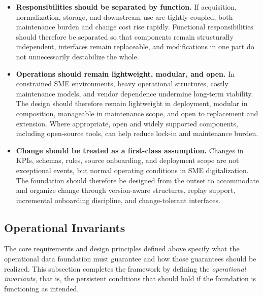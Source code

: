\documentclass[systems,article,submit,pdftex,moreauthors]{Definitions/mdpi}
\begin{document}
\begin{itemize}
    \item[\textbf{P5.}] \textbf{Responsibilities should be separated by function.} If acquisition, normalization, storage, and downstream use are tightly coupled, both maintenance burden and change cost rise rapidly. Functional responsibilities should therefore be separated so that components remain structurally independent, interfaces remain replaceable, and modifications in one part do not unnecessarily destabilize the whole.

    \item[\textbf{P6.}] \textbf{Operations should remain lightweight, modular, and open.} In constrained SME environments, heavy operational structures, costly maintenance models, and vendor dependence undermine long-term viability. The design should therefore remain lightweight in deployment, modular in composition, manageable in maintenance scope, and open to replacement and extension. Where appropriate, open and widely supported components, including open-source tools, can help reduce lock-in and maintenance burden.
    
    \item[\textbf{P7.}] \textbf{Change should be treated as a first-class assumption.} Changes in KPIs, schemas, rules, source onboarding, and deployment scope are not exceptional events, but normal operating conditions in SME digitalization. The foundation should therefore be designed from the outset to accommodate and organize change through version-aware structures, replay support, incremental onboarding discipline, and change-tolerant interfaces.
\end{itemize}

\subsection{Operational Invariants}
\label{sec:operational_invariants}

The core requirements and design principles defined above specify what the operational data foundation must guarantee and how those guarantees should be realized. This subsection completes the framework by defining the \emph{operational invariants}, that is, the persistent conditions that should hold if the foundation is functioning as intended.
\end{document}
